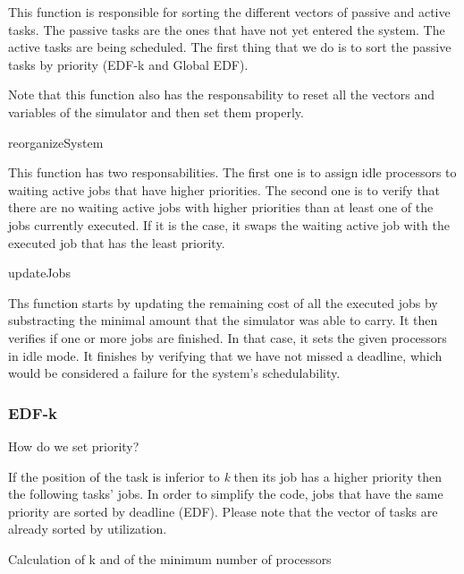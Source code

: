 \documentclass[11pt, a4paper,titlepage]{article}
\begin{document}
This function is responsible for sorting the different vectors of passive and active tasks. The passive tasks are the ones that have not yet entered the system. The active tasks are being scheduled. The first thing that we do is to sort the passive tasks by priority (EDF-k and Global EDF).

Note that this function also has the responsability to reset all the vectors and variables of the simulator and then set them properly.

\begin{description}
\item [reorganizeSystem] \hfill
\end{description}

This function has two responsabilities. The first one is to assign idle processors to waiting active jobs that have higher priorities. The second one is to verify that there are no waiting active jobs with higher priorities than at least one of the jobs currently executed. If it is the case, it swaps the waiting active job with the executed job that has the least priority.

\begin{description}
\item [updateJobs] \hfill
\end{description}

Ths function starts by updating the remaining cost of all the executed jobs by substracting the minimal amount that the simulator was able to carry. It then verifies if one or more jobs are finished. In that case, it sets the given processors in idle mode. It finishes by verifying that we have not missed a deadline, which would be considered a failure for the system's schedulability.

\subsubsection{EDF-k}

\begin{description}
\item [How do we set priority?] \hfill
\end{description}

If the position of the task is inferior to \emph{k} then its job has a higher priority then the following tasks' jobs. In order to simplify the code, jobs that have the same priority are sorted by deadline (EDF). Please note that the vector of tasks are already sorted by utilization.

\begin{description}
\item [Calculation of k and of the minimum number of processors] \hfill
\end{description}
\end{document}

